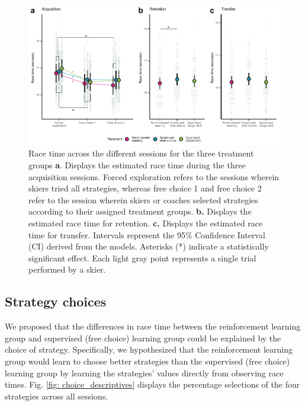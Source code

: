 \documentclass[pdflatex,sn-mathphys-num]{sn-jnl}%
\theoremstyle{thmstyleone}%
\theoremstyle{thmstyletwo}%
\theoremstyle{thmstylethree}%
\begin{document}
\begin{figure}[H]
\centering
\includegraphics{figures/figure_racingtimes_2.pdf}
\caption{Race time across the different sessions for the three treatment groups \textbf{a}. Displays the estimated race time during the three acquisition sessions. Forced exploration refers to the sessions wherein skiers tried all strategies, whereas free choice 1 and free choice 2 refer to the session wherein skiers or coaches selected strategies according to their assigned treatment groups. \textbf{b.} Displays the estimated race time for retention. \textbf{c.} Displays the estimated race time for transfer. Intervals represent the 95\% Confidence Interval (CI) derived from the models. Asterisks (*) indicate a statistically significant effect. Each light gray point represents a single trial performed by a skier.}
\label{fig: racetime}
\end{figure}


\subsection{Strategy choices}\label{result_strategychoice}
We proposed that the differences in race time between the reinforcement learning group and supervised (free choice) learning group could be explained by the choice of strategy. Specifically, we hypothesized that the reinforcement learning group would learn to choose better strategies than the supervised (free choice) learning group by learning the strategies' values directly from observing race times. Fig. \ref{fig: choice_descriptives} displays the percentage selections of the four strategies across all sessions.
\end{document}
